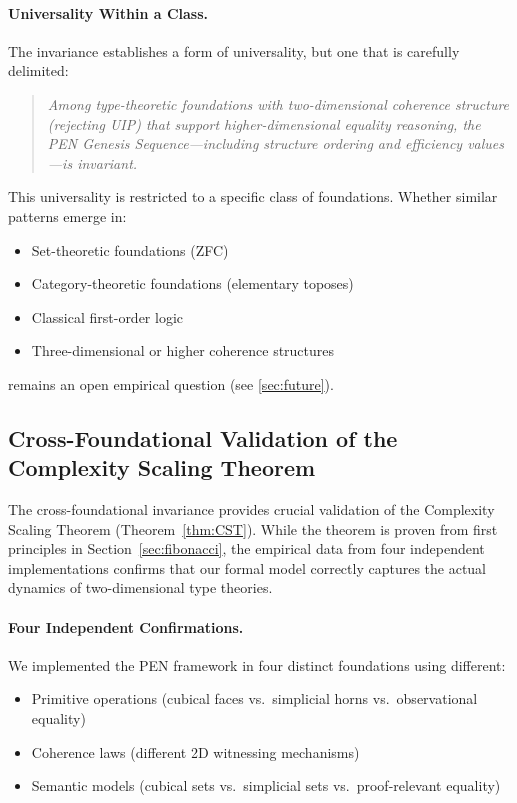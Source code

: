 \documentclass[11pt]{article}
\theoremstyle{definition}
\theoremstyle{remark}
\begin{document}
\paragraph{Universality Within a Class.}

The invariance establishes a form of universality, but one that is carefully delimited:

\begin{quote}
\textit{Among type-theoretic foundations with two-dimensional coherence structure (rejecting UIP) that support higher-dimensional equality reasoning, the PEN Genesis Sequence---including structure ordering and efficiency values---is invariant.}
\end{quote}

This universality is restricted to a specific class of foundations. Whether similar patterns emerge in:
\begin{itemize}
\item Set-theoretic foundations (ZFC)
\item Category-theoretic foundations (elementary toposes)
\item Classical first-order logic
\item Three-dimensional or higher coherence structures
\end{itemize}
remains an open empirical question (see \cref{sec:future}).

\subsection{Cross-Foundational Validation of the Complexity Scaling Theorem}

The cross-foundational invariance provides crucial validation of the Complexity Scaling Theorem (Theorem~\ref{thm:CST}). While the theorem is proven from first principles in Section~\ref{sec:fibonacci}, the empirical data from four independent implementations confirms that our formal model correctly captures the actual dynamics of two-dimensional type theories.

\paragraph{Four Independent Confirmations.}

We implemented the PEN framework in four distinct foundations using different:
\begin{itemize}
\item Primitive operations (cubical faces vs.\ simplicial horns vs.\ observational equality)
\item Coherence laws (different 2D witnessing mechanisms)
\item Semantic models (cubical sets vs.\ simplicial sets vs.\ proof-relevant equality)
\end{itemize}
\end{document}
